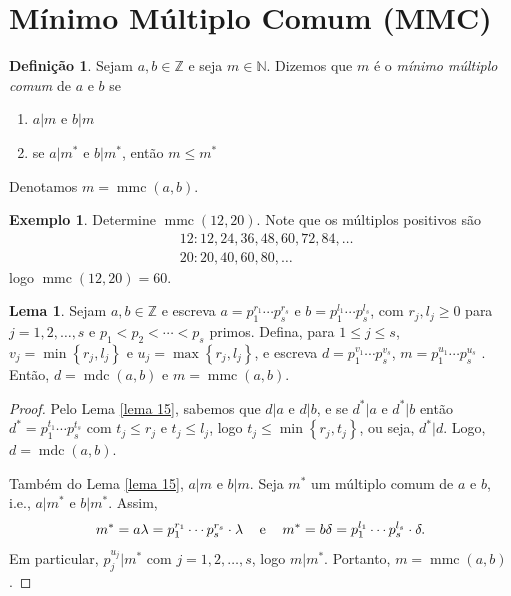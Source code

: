 \documentclass[a4paper,11pt,twoside, leqno]{article}
\DeclareMathOperator{\mdc}{mdc}
\DeclareMathOperator{\mmc}{mmc}
\theoremstyle{definition}
\newtheorem*{definition}{Definição}
\newtheorem{lemma}[theorem]{Lema}
\newtheorem*{example}{Exemplo}
\begin{document}
\section{Mínimo Múltiplo Comum (MMC)}
\begin{definition}
	Sejam $a,b\in\mathbb{Z}$ e seja $m\in\mathbb{N}$. Dizemos que $m$ é o {\em mínimo múltiplo comum} de $a$ e $b$ se
	\begin{enumerate}
		\item $a|m$ e $b|m$
		\item se $a|m^\ast$ e $b|m^\ast$, então $m\leq m^\ast$
	\end{enumerate}
	Denotamos $m = \mmc(a,b)$.
\end{definition}
\begin{example}
	Determine $\mmc(12,20)$. Note que os múltiplos positivos são
	\begin{align*}
	&12: 12, 24, 36, 48, 60, 72, 84, \dots \\
	&20: 20, 40, 60, 80, \dots
	\end{align*}
	logo $\mmc(12,20) = 60$.
\end{example}
\begin{lemma}
	\label{lema 17}
	Sejam $a,b\in\mathbb{Z}$ e escreva $a = p_1^{r_1}\cdots p_s^{r_s}$ e $b = p_1^{l_1}\cdots p_s^{l_s}$, com $r_j,l_j\geq 0$ para $j = 1,2,\dots,s$ e $p_1 < p_2 < \cdots < p_s$ primos. Defina, para $1\leq j\leq s$, $v_j = \min\left\{ r_j, l_j \right\}$ e $u_j = \max\left\{ r_j,l_j \right\}$, e escreva $d = p_1^{v_1}\cdots p_s^{v_s}$, $m = p_1^{u_1}\cdots p_s^{u_s}$ . Então, $d = \mdc(a,b)$ e $m = \mmc(a,b)$.
\end{lemma}
\begin{proof}
	Pelo Lema \eqref{lema 15}, sabemos que $d|a$ e $d|b$, e se $d^\ast |a$ e $d^\ast |b$ então $d^\ast = p_1^{t_1}\cdots p_s^{t_s}$ com $t_j\leq r_j$ e $t_j\leq l_j$, logo $t_j\leq\min\left\{ r_j,t_j \right\}$, ou seja, $d^\ast|d$. Logo, $d = \mdc(a,b)$.
	
	Também do Lema \eqref{lema 15}, $a|m$ e $b|m$. Seja $m^\ast$ um múltiplo comum de $a$ e $b$, i.e., $a|m^\ast$ e $b|m^\ast$. Assim, 
	\begin{align*}
	m^\ast = a\lambda = p_1^{r_1}\cdots p_s^{r_s}\cdot\lambda \hspace{0.3cm}\text{ e }\hspace{0.3cm} m^\ast = b\delta = p_1^{l_1}\cdots p_s^{l_s}\cdot\delta .
	\end{align*}
	Em particular, $p_j^{u_j}|m^\ast$ com $j = 1,2,\dots,s$, logo $m|m^\ast$. Portanto, $m = \mmc(a,b)$.
\end{proof}
\end{document}
